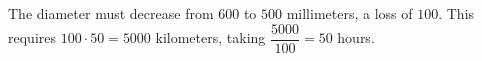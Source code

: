 The diameter must decrease from $600$ to $500$ millimeters, a loss of $100$. This requires $100\cdot50=5000$ kilometers, taking $\dfrac{5000}{100}=\boxed{50}$ hours.
